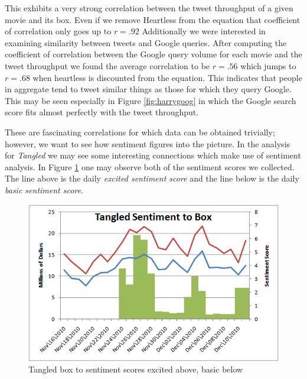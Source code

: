 \documentclass[11pt]{article}
\begin{document}
This exhibits a very strong correlation between the tweet throughput of a given movie and its box. Even if we remove Heartless from the equation that coefficient of correlation only goes up to $r=.92$ Additionally we were interested in examining similarity between tweets and Google queries. After computing the coefficient of correlation between the Google query volume for each movie and the tweet throughput we found the average correlation to be $r=.56$ which jumps to $r=.68$ when heartless is discounted from the equation. This indicates that people in aggregate tend to tweet similar things as those for which they query Google. This may be seen especially in Figure \ref{fig:harrygoog} in which the Google search score fits almost perfectly with the tweet throughput.

These are fascinating correlations for which data can be obtained trivially; however, we want to see how sentiment figures into the picture. In the analysis for \textit{Tangled} we may see some interesting connections which make use of sentiment analysis. In Figure \ref{fig:tangledsimpsent} one may observe both of the sentiment scores we collected. The line above is the daily \textit{excited sentiment score} and the line below is the daily \textit{basic sentiment score}.

\begin{figure}[ht!]
\centering
\includegraphics[scale=.6]{img/tangledsimpsent.png} 
\caption{Tangled box to sentiment scores excited above, basic below}
\label{fig:tangledsimpsent}
\end{figure}
\end{document}
